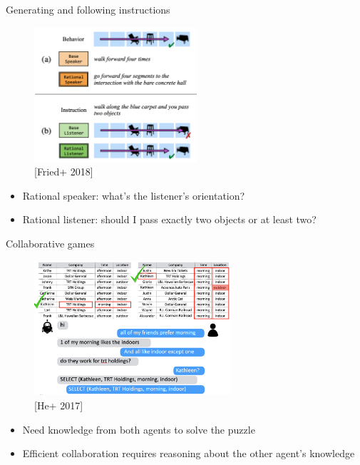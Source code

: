 \documentclass[usenames,dvipsnames,notes]{beamer}
\begin{document}
\begin{frame}
    {Generating and following instructions}
    \begin{figure}
        \includegraphics[height=5cm]{figures/ins-gen-follow}
        \caption{[Fried+ 2018]}
    \end{figure}
    \vspace{-1em}
    \begin{itemize}
        \item Rational speaker: what's the listener's orientation?
        \item Rational listener: should I pass exactly two objects or at least two? 
    \end{itemize}
\end{frame}

\begin{frame}
    {Collaborative games}
    \begin{figure}
        \includegraphics[height=5cm]{figures/mutualfriends}
        \caption{[He+ 2017]}
    \end{figure}
    \begin{itemize}
        \item Need knowledge from both agents to solve the puzzle
        \item Efficient collaboration requires reasoning about the other agent's knowledge 
    \end{itemize}
\end{frame}
\end{document}
